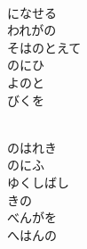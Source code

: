 \documentclass[10pt,b5j]{tarticle} %
\begin{document}
\vspace{1.5em} %
\newcommand{\linespace}{0.5em} %
\newcommand{\blocksize}{0.5\hsize} %
\newcommand{\itemmargin}{3em} %
\begin{enumerate} %
    \setlength{\itemindent}{\itemmargin} %
    \begin{minipage}[c]{\blocksize}
    
        \vspace{\linespace}
        \item~\\
        になせる\\
        われがの\\
        そはのとえて\\
        のにひ\\
        よのと\\
        びくを
        
    \end{minipage}
    \begin{minipage}[c]{\blocksize}
        
        \vspace{\linespace}
        \item~\\
        のはれき\\
        のにふ\\
        ゆくしばし\\
        きの\\
        べんがを\\
        へはんの
    
    \end{minipage}
\end{enumerate} %
\end{document}
